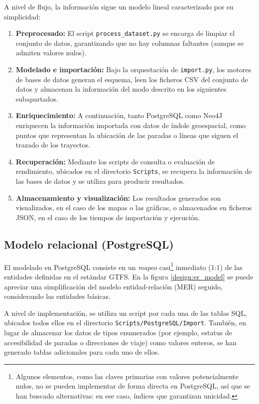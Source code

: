 A nivel de flujo, la información sigue un modelo lineal caracterizado por su simplicidad:

\begin{enumerate}
    \item \textbf{Preprocesado:} El script \texttt{process\_dataset.py} se encarga de limpiar el conjunto de datos, garantizando que no hay columnas faltantes (aunque se admiten valores nulos).
    \item \textbf{Modelado e importación:} Bajo la orquestación de \texttt{import.py}, los motores de bases de datos generan el esquema, leen los ficheros CSV del conjunto de datos y almacenan la información del modo descrito en los siguientes subapartados.
    \item \textbf{Enriquecimiento:} A continuación, tanto PostgreSQL como Neo4J enriquecen la información importada con datos de índole geoespacial, como puntos que representan la ubicación de las paradas o líneas que siguen el trazado de los trayectos.
    \item \textbf{Recuperación:} Mediante los scripts de consulta o evaluación de rendimiento, ubicados en el directorio \texttt{Scripts}, se recupera la información de las bases de datos y se utiliza para producir resultados.
    \item \textbf{Almacenamiento y visualización:} Los resultados generados son visualizados, en el caso de los mapas o las gráficas, o almacenados en ficheros JSON, en el caso de los tiempos de importación y ejecución.
\end{enumerate}

\subsection{Modelo relacional (PostgreSQL)}

El modelado en PostgreSQL consiste en un \textit{mapeo} casi\footnote{Algunos elementos, como las claves primarias con valores potencialmente nulos, no se pueden implementar de forma directa en PostgreSQL, así que se han buscado alternativas: en ese caso, índices que garantizan unicidad.} inmediato (1:1) de las entidades definidas en el estándar GTFS. En la figura \ref{design:er_model} se puede apreciar una simplificación del modelo entidad-relación (MER) seguido, considerando las entidades básicas.

A nivel de implementación, se utiliza un script por cada una de las tablas SQL, ubicados todos ellos en el directorio \texttt{Scripts/PostgreSQL/Import}. También, en lugar de almacenar los datos de tipos enumerados (por ejemplo, estatus de accesibilidad de paradas o direcciones de viaje) como valores enteros, se han generado tablas adicionales para cada uno de ellos.

